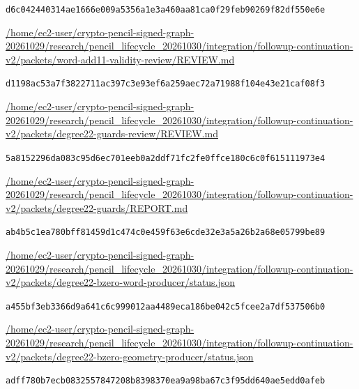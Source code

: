 \documentclass[10pt]{article}
\begin{document}
{\scriptsize\texttt{d6c042440314ae1666e009a5356a1e3a460aa81ca0f29feb90269f82df550e6e}}\par\medskip
\noindent\url{/home/ec2-user/crypto-pencil-signed-graph-20261029/research/pencil_lifecycle_20261030/integration/followup-continuation-v2/packets/word-add11-validity-review/REVIEW.md}\par
{\scriptsize\texttt{d1198ac53a7f3822711ac397c3e93ef6a259aec72a71988f104e43e21caf08f3}}\par\medskip
\noindent\url{/home/ec2-user/crypto-pencil-signed-graph-20261029/research/pencil_lifecycle_20261030/integration/followup-continuation-v2/packets/degree22-guards-review/REVIEW.md}\par
{\scriptsize\texttt{5a8152296da083c95d6ec701eeb0a2ddf71fc2fe0ffce180c6c0f615111973e4}}\par\medskip
\noindent\url{/home/ec2-user/crypto-pencil-signed-graph-20261029/research/pencil_lifecycle_20261030/integration/followup-continuation-v2/packets/degree22-guards/REPORT.md}\par
{\scriptsize\texttt{ab4b5c1ea780bff81459d1c474c0e459f63e6cde32e3a5a26b2a68e05799be89}}\par\medskip
\noindent\url{/home/ec2-user/crypto-pencil-signed-graph-20261029/research/pencil_lifecycle_20261030/integration/followup-continuation-v2/packets/degree22-bzero-word-producer/status.json}\par
{\scriptsize\texttt{a455bf3eb3366d9a641c6c999012aa4489eca186be042c5fcee2a7df537506b0}}\par\medskip
\noindent\url{/home/ec2-user/crypto-pencil-signed-graph-20261029/research/pencil_lifecycle_20261030/integration/followup-continuation-v2/packets/degree22-bzero-geometry-producer/status.json}\par
{\scriptsize\texttt{adff780b7ecb0832557847208b8398370ea9a98ba67c3f95dd640ae5edd0afeb}}\par\medskip
\end{document}
